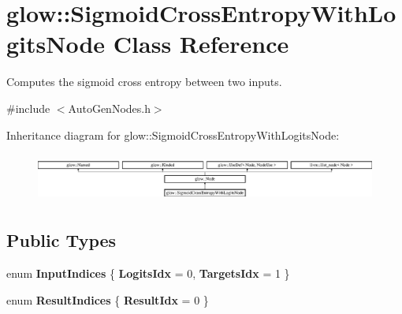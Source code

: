 \hypertarget{classglow_1_1_sigmoid_cross_entropy_with_logits_node}{}\section{glow\+:\+:Sigmoid\+Cross\+Entropy\+With\+Logits\+Node Class Reference}
\label{classglow_1_1_sigmoid_cross_entropy_with_logits_node}


Computes the sigmoid cross entropy between two inputs.  




{\ttfamily \#include $<$Auto\+Gen\+Nodes.\+h$>$}

Inheritance diagram for glow\+:\+:Sigmoid\+Cross\+Entropy\+With\+Logits\+Node\+:\begin{figure}[H]
\begin{center}
\leavevmode
\includegraphics[height=1.615385cm]{classglow_1_1_sigmoid_cross_entropy_with_logits_node}
\end{center}
\end{figure}
\subsection*{Public Types}
\begin{DoxyCompactItemize}
\item 
\mbox{\label{classglow_1_1_sigmoid_cross_entropy_with_logits_node_a371b86fe579f14300a1c11a6d1f3885b}} 
enum {\bfseries Input\+Indices} \{ {\bfseries Logits\+Idx} = 0, 
{\bfseries Targets\+Idx} = 1
 \}
\item 
\mbox{\label{classglow_1_1_sigmoid_cross_entropy_with_logits_node_a74d51e491a688a855ba158bd53639aa7}} 
enum {\bfseries Result\+Indices} \{ {\bfseries Result\+Idx} = 0
 \}
\end{DoxyCompactItemize}
